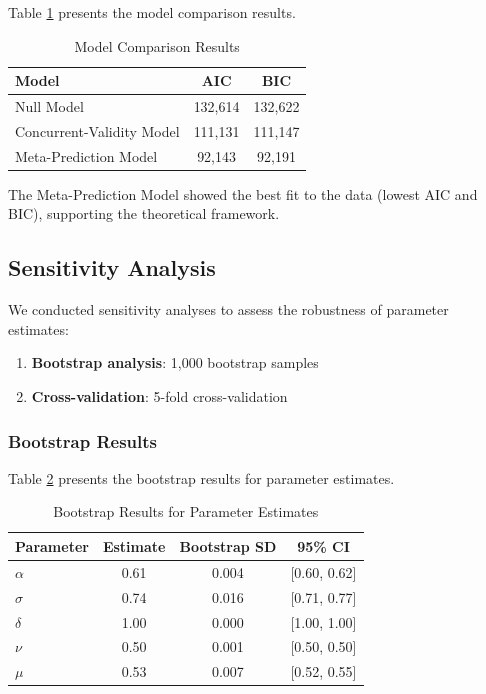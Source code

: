 Table \ref{tab:model_comparison} presents the model comparison results.

\begin{table}[h]
\centering
\begin{tabular}{lcc}
\toprule
\textbf{Model} & \textbf{AIC} & \textbf{BIC} \\
\midrule
Null Model & 132,614 & 132,622 \\
Concurrent-Validity Model & 111,131 & 111,147 \\
Meta-Prediction Model & 92,143 & 92,191 \\
\bottomrule
\end{tabular}
\caption{Model Comparison Results}
\label{tab:model_comparison}
\end{table}

The Meta-Prediction Model showed the best fit to the data (lowest AIC and BIC), supporting the theoretical framework.

\subsection{Sensitivity Analysis}

We conducted sensitivity analyses to assess the robustness of parameter estimates:

\begin{enumerate}
    \item \textbf{Bootstrap analysis}: 1,000 bootstrap samples
    \item \textbf{Cross-validation}: 5-fold cross-validation
\end{enumerate}

\subsubsection{Bootstrap Results}

Table \ref{tab:bootstrap} presents the bootstrap results for parameter estimates.

\begin{table}[h]
\centering
\begin{tabular}{lccc}
\toprule
\textbf{Parameter} & \textbf{Estimate} & \textbf{Bootstrap SD} & \textbf{95\% CI} \\
\midrule
$\alpha$ & 0.61 & 0.004 & [0.60, 0.62] \\
$\sigma$ & 0.74 & 0.016 & [0.71, 0.77] \\
$\delta$ & 1.00 & 0.000 & [1.00, 1.00] \\
$\nu$ & 0.50 & 0.001 & [0.50, 0.50] \\
$\mu$ & 0.53 & 0.007 & [0.52, 0.55] \\
\bottomrule
\end{tabular}
\caption{Bootstrap Results for Parameter Estimates}
\label{tab:bootstrap}
\end{table}

